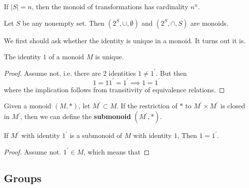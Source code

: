   \begin{theorem}
    If $|S| = n$, then the monoid of transformations has cardinality $n^n$. 
  \end{theorem}

  \begin{example}
    Let $S$ be any nonempty set. Then $(2^S, \cup, \emptyset)$ and $(2^S, \cap, S)$ are monoids. 
  \end{example}

  We first should ask whether the identity is unique in a monoid. It turns out it is. 

  \begin{lemma}
    The identity $1$ of a monoid $M$ is unique. 
  \end{lemma}
  \begin{proof}
    Assume not, i.e. there are 2 identities $1 \neq 1^\prime$. But then 
    \begin{equation}
      1 = 1 1^\prime = 1^\prime \implies 1 = 1^\prime
    \end{equation}
    where the implication follows from transitivity of equivalence relations. 
  \end{proof} 

  \begin{definition}[Submonoid]
    Given a monoid $(M, \ast)$, let $M^\prime \subset M$. If the restriction of $\ast$ to $M^\prime \times M^\prime$ is closed in $M^\prime$, then we can define the \textbf{submonoid} $(M^\prime, \ast)$. 
  \end{definition} 

  \begin{theorem}
    If $M^\prime$ with identity $1^\prime$ is a submonoid of $M$ with identity $1$, Then $1 = 1^\prime$. 
  \end{theorem}
  \begin{proof}
    Assume not. $1^\prime \in M$, which means that 
  \end{proof}

\subsection{Groups}

